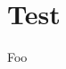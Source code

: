 \documentclass[11pt,a4paper]{article}
\title{\Huge{\articletitle}}
\author{
	Author Name \\
	\normalsize{Department} \\
	\normalsize{Organization}
}
\date{\normalsize{\todayiso}}
\begin{document}
\maketitle
\thispagestyle{empty}
\newpage



\setcounter{page}{1}
\section{Test}
Foo

%
%
%

%
%


%
\end{document}
